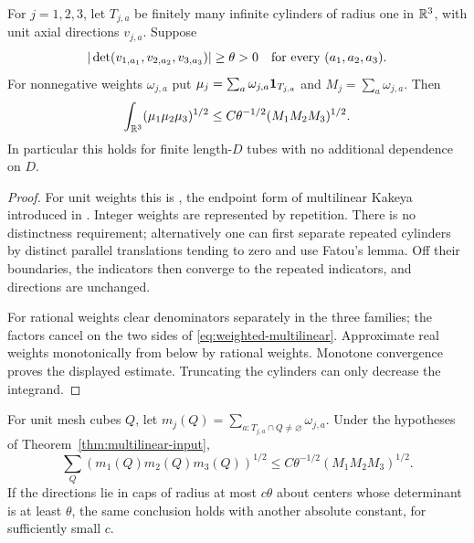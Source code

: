 \begin{theorem}\label{thm:multilinear-input}
For $j=1,2,3$, let $T_{j,a}$ be finitely many infinite cylinders of
radius one in $\mathbb R^3$, with unit axial directions $v_{j,a}$. Suppose
\[
 |\det(v_{1,a_1},v_{2,a_2},v_{3,a_3})|\ge\theta>0
 \quad\hbox{for every }(a_1,a_2,a_3).
\]
For nonnegative weights $\omega_{j,a}$ put
$\mu_j=\sum_a\omega_{j,a}\mathbf 1_{T_{j,a}}$ and
$M_j=\sum_a\omega_{j,a}$. Then
\begin{equation}\label{eq:weighted-multilinear}
 \int_{\mathbb R^3}(\mu_1\mu_2\mu_3)^{1/2}
 \le C\theta^{-1/2}(M_1M_2M_3)^{1/2}.
\end{equation}
In particular this holds for finite length-$D$ tubes with no
additional dependence on $D$.
\end{theorem}

\begin{proof}
For unit weights this is
\citet[Theorem~1.3, p.~264]{Guth2010}, the endpoint form of
multilinear Kakeya introduced in
\citet[Theorem~1.15]{BCT2006}. Integer weights are represented by
repetition. There is no distinctness requirement; alternatively
one can first separate repeated cylinders by distinct parallel
translations tending to zero and use Fatou's lemma. Off their
boundaries, the indicators then converge to the repeated indicators,
and directions are unchanged.

For rational weights clear denominators separately in the three
families; the factors cancel on the two sides of
\eqref{eq:weighted-multilinear}. Approximate real weights
monotonically from below by rational weights. Monotone convergence
proves the displayed estimate. Truncating the cylinders can only
decrease the integrand.
\end{proof}

\begin{corollary}\label{cor:multilinear-cubes}
For unit mesh cubes $Q$, let
$m_j(Q)=\sum_{a:T_{j,a}\cap Q\ne\varnothing}\omega_{j,a}$.
Under the hypotheses of Theorem~\ref{thm:multilinear-input},
\begin{equation}\label{eq:multilinear-cubes}
 \sum_Q(m_1(Q)m_2(Q)m_3(Q))^{1/2}
 \le C\theta^{-1/2}(M_1M_2M_3)^{1/2}.
\end{equation}
If the directions lie in caps of radius at most $c\theta$ about
centers whose determinant is at least $\theta$, the same conclusion
holds with another absolute constant, for sufficiently small $c$.
\end{corollary}

